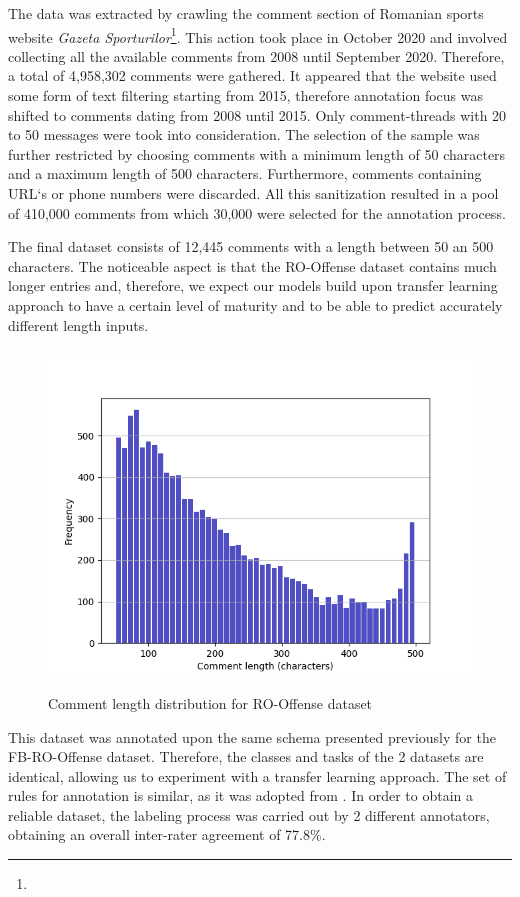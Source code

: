 \documentclass[12pt,a4paper]{report}
\begin{document}
The data was extracted by crawling the comment section of Romanian sports website \textit{Gazeta Sporturilor}\footnote{\urlGSP}. This action took place in October 2020 and involved collecting all the available comments from 2008 until September 2020. Therefore, a total of 4,958,302 comments were gathered. It appeared that the website used some form of text filtering starting from 2015, therefore annotation focus was shifted to comments dating from 2008 until 2015. Only comment-threads with 20 to 50 messages were took into consideration. The selection of the sample was further restricted by choosing comments with a minimum length of 50 characters and a maximum length of 500 characters. Furthermore, comments containing URL`s or phone numbers were discarded. All this sanitization resulted in a pool of 410,000 comments from which 30,000 were selected for the annotation process.

The final dataset consists of 12,445 comments with a length between 50 an 500 characters. The noticeable aspect is that the RO-Offense dataset contains much longer entries and, therefore, we expect our models build upon transfer learning approach to have a certain level of maturity and to be able to predict accurately different length inputs.

\begin{figure}[H]
\centering
\includegraphics[height=9cm]{pics/RO-OFFENSE-Metrics3.png}
  \caption{Comment length distribution for RO-Offense dataset}
  \label{fig:RO-Distribution}
\end{figure}

This dataset was annotated upon the same schema presented previously for the FB-RO-Offense dataset. Therefore, the classes and tasks of the 2 datasets are identical, allowing us to experiment with a transfer learning approach.
The set of rules for annotation is similar, as it was adopted from \citet{wiegand2018overview}.
In order to obtain a reliable dataset, the labeling process was carried out by 2 different annotators, obtaining an overall inter-rater agreement of 77.8\%.
\end{document}
